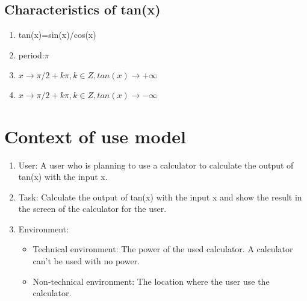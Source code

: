 \documentclass[10pt,a4paper,twoside]{article}
\begin{document}




\subsection{Characteristics of tan(x)}
\begin{enumerate}
\item tan(x)=sin(x)/cos(x)
\item period:$\pi$
\item $x\rightarrow \pi /2+k\pi, k\in Z,tan(x)\rightarrow+\infty$
\item $x\rightarrow\pi/2+k\pi, k\in Z,tan(x)\rightarrow-\infty$
\end{enumerate}


\section{Context of use model}

\begin{enumerate}
\item 
User: A user who is planning to use a calculator to calculate the output of tan(x) with the input x.
\item
Task: Calculate the output of tan(x) with the input x and show the result in the screen of the calculator for the user.
\item
Environment:
\begin{itemize}
\item Technical environment:
The power of the used calculator. A calculator can't be used with no power.
\item Non-technical environment:
The location where the user use the calculator.
\end{itemize}
\end{enumerate}
\end{document}
